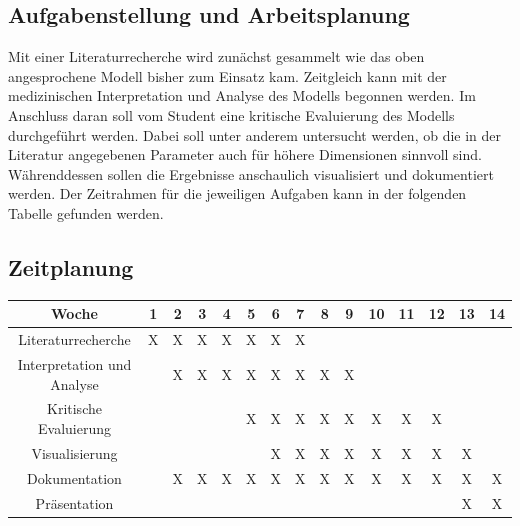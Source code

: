 \documentclass[12pt]{article}
\begin{document}
\subsection*{Aufgabenstellung und Arbeitsplanung}
Mit einer Literaturrecherche wird zunächst gesammelt wie das oben angesprochene Modell bisher zum Einsatz kam. Zeitgleich kann mit der medizinischen Interpretation und Analyse des Modells begonnen werden. Im Anschluss daran soll vom Student eine kritische Evaluierung des Modells durchgeführt werden. Dabei soll unter anderem untersucht werden, ob die in der Literatur angegebenen Parameter auch für höhere Dimensionen sinnvoll sind. \newline
Währenddessen sollen die Ergebnisse anschaulich visualisiert und dokumentiert werden. Der Zeitrahmen für die jeweiligen Aufgaben kann in der folgenden Tabelle gefunden werden. 
\subsection*{Zeitplanung}
\begin{center}
\begin{tabular}{| c || c | c |c |c |c |c |c |c |c |c |c |c |c| c |}
  \hline
  Woche & 1 & 2 & 3 & 4 & 5 & 6 & 7 & 8 & 9 & 10 & 11 & 12 & 13 & 14 \\
  \hline
  \hline 
  Literaturrecherche & X & X & X  &  X & X  & X  & X  & & & & & & & \\
            \hline  
  Interpretation und Analyse & & X &  X & X  &X  &X  &X  &X  &X  & & & & & \\  
            \hline  
    Kritische Evaluierung & & & & & X  &X  &X  & X  &X  &X  &X  &X  & & \\  
              \hline  
      Visualisierung & & & & & & X &X  &X  &X  &X  &X  &X  & X  & \\  
                \hline  
        Dokumentation & & X& X& X& X& X& X& X& X& X & X& X&X &X \\  
                  \hline  
          Präsentation & & & & & & & & & & & & & X &X \\ 
          \hline  
\end{tabular}
\end{center}
\newpage
\end{document}

